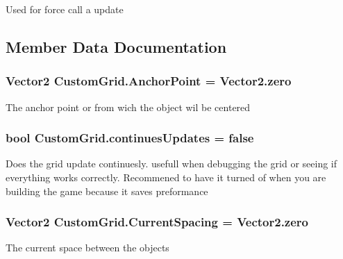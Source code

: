 Used for force call a update 



\subsection{Member Data Documentation}
\subsubsection[{\texorpdfstring{Anchor\+Point}{AnchorPoint}}]{\setlength{\rightskip}{0pt plus 5cm}Vector2 Custom\+Grid.\+Anchor\+Point = Vector2.\+zero}\hypertarget{class_custom_grid_af7596d0b65aa5ea01ae27898c523b1b5}{}\label{class_custom_grid_af7596d0b65aa5ea01ae27898c523b1b5}


The anchor point or from wich the object wil be centered 

\subsubsection[{\texorpdfstring{continues\+Updates}{continuesUpdates}}]{\setlength{\rightskip}{0pt plus 5cm}bool Custom\+Grid.\+continues\+Updates = false}\hypertarget{class_custom_grid_a9bddd45525d796a4db2edcbe8f669773}{}\label{class_custom_grid_a9bddd45525d796a4db2edcbe8f669773}


Does the grid update continuesly. usefull when debugging the grid or seeing if everything works correctly. Recommened to have it turned of when you are building the game because it saves preformance 

\subsubsection[{\texorpdfstring{Current\+Spacing}{CurrentSpacing}}]{\setlength{\rightskip}{0pt plus 5cm}Vector2 Custom\+Grid.\+Current\+Spacing = Vector2.\+zero}\hypertarget{class_custom_grid_ab9594c84442d7bd9f8cad31cd2d75c84}{}\label{class_custom_grid_ab9594c84442d7bd9f8cad31cd2d75c84}


The current space between the objects 

